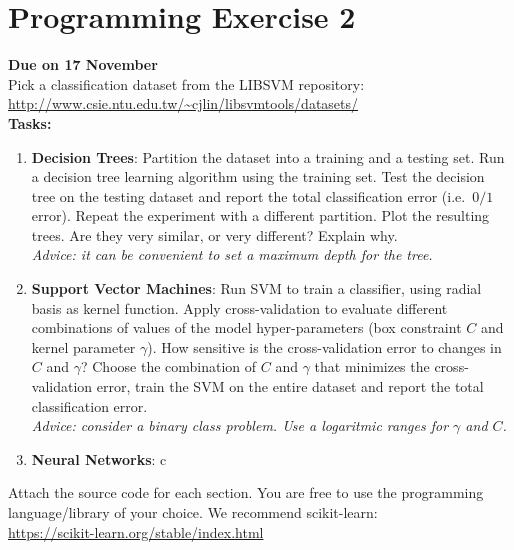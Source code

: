 \documentclass{article}
\begin{document}
  \section*{Programming Exercise 2}

  {\bf Due on 17 November}\\

  Pick a classification dataset from the LIBSVM repository:\\

  \url{http://www.csie.ntu.edu.tw/~cjlin/libsvmtools/datasets/}\\

  \noindent
  {\bf Tasks:}

  \begin{enumerate}
  \item \textbf{Decision Trees}: Partition the dataset into a training and a testing set. Run a decision tree learning algorithm using the training set. Test the decision tree on the testing dataset and report the total classification error (i.e.~$0/1$ error). Repeat the experiment with a different partition. Plot the resulting trees. Are they very similar, or very different? Explain why.\\ \emph{Advice: it can be convenient to set a maximum depth for the tree.}
  \item \textbf{Support Vector Machines}: Run SVM to train a classifier, using radial basis as kernel function. Apply cross-validation to evaluate different combinations of values of the model hyper-parameters (box constraint $C$ and kernel parameter $\gamma$). How sensitive is the cross-validation error to changes in $C$ and $\gamma$? Choose the combination of $C$ and $\gamma$ that minimizes the cross-validation error, train the SVM on the entire dataset and report the total classification error.\\
\emph{Advice: consider a binary class problem. Use a logaritmic ranges for $\gamma$ and $C$.}
  \item \textbf{Neural Networks}: c  \end{enumerate}

  Attach the source code for each section. You are free to use the programming language/library of your choice.
	We recommend scikit-learn:\\

 \url{https://scikit-learn.org/stable/index.html}
\end{document}
